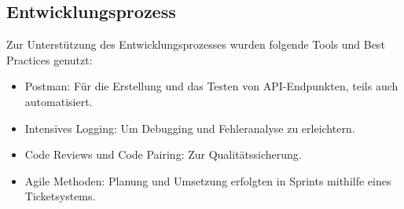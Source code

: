 \subsection{Entwicklungsprozess}

Zur Unterstützung des Entwicklungsprozesses wurden folgende Tools und Best Practices genutzt:
\begin{itemize}
	\item Postman: Für die Erstellung und das Testen von API-Endpunkten, teils auch automatisiert.
	\item Intensives Logging: Um Debugging und Fehleranalyse zu erleichtern.
	\item Code Reviews und Code Pairing: Zur Qualitätssicherung.
	\item Agile Methoden: Planung und Umsetzung erfolgten in Sprints mithilfe eines Ticketsystems.
\end{itemize}